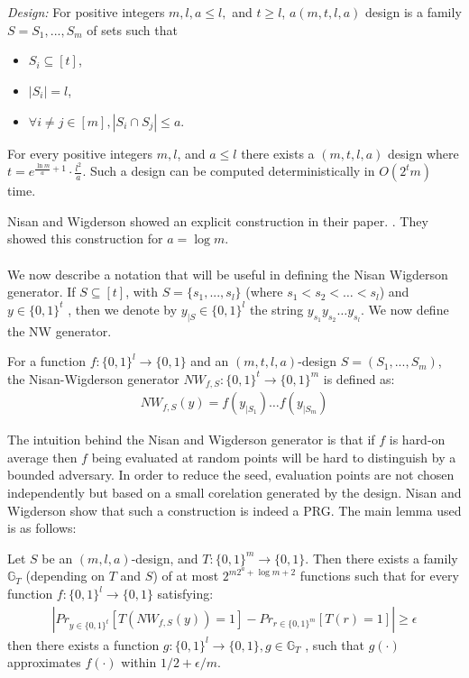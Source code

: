 \\~\\
\textit{Design:} For positive integers $m, l, a \leq l,$ and $t \geq l$, $a(m, t, l, a)$
design is a family $S = S_1 , . . . , S_m$ of sets such that
\begin{itemize}
	\item $S_i \subseteq [t]$,
	\item $|S_i| = l$,
	\item $\forall i \neq j \in [m], |S_i \cap S_j| \leq a$.
\end{itemize} 
\begin{lemma}
	\label{design_const}
	For every positive integers $m, l$, and $a \leq l$ there exists a $(m, t, l, a)$ design where $t = e^{\frac{\ln m}{a} + 1} \cdot \frac{l^2}{a}$. Such a design can be computed deterministically in $O(2^t m)$ time.
\end{lemma}
Nisan and Wigderson showed an explicit construction in their paper. \cite{Nisan:1994:HVR:192095.192097}. They showed this construction for $a = \log m$.
\\~\\
We now describe a notation that will be useful in defining the Nisan Wigderson generator. If $S \subseteq [t]$, with $S = \{s_1 , . . . , s_l \}$ (where $s_1 < s_2 < \ldots < s_l$) and $y \in \{0, 1\}^t$ , then we denote by $y_{|S} \in \{0, 1\}^l$ the string $y_{s_1}y_{s_2} \ldots y_{s_l}$. We now define the NW generator.
\begin{definition}
	For a function $f : \{0, 1\}^l \rightarrow \{0, 1\}$ and an $(m, t, l, a)$-design $S = (S_1 , . . . , S_m)$, the Nisan-Wigderson generator $NW_{f,S} : \{0,1\}^t \rightarrow \{0, 1\}^m$ is defined as:
	\begin{align*}
		NW_{f,S}(y) = f(y_{|S_1})\ldots f(y_{|S_m})
	\end{align*}
\end{definition}
The intuition behind the Nisan and Wigderson generator is that if $f$ is hard-on average then $f$ being evaluated at random points will be hard to distinguish by a bounded adversary. In order to reduce the seed, evaluation points are not chosen independently but based on a small corelation generated by the design. Nisan and Wigderson show that such a construction is indeed a PRG.
The main lemma used is as follows:
\begin{lemma}
Let $S$ be an $(m, l, a)$-design, and $T : \{0, 1\}^m \rightarrow \{0, 1\}$. Then there exists a family $\mathbb{G}_T$ (depending on $T$ and $S$) of at most $2^{m2^a +\log m+2}$ functions such that for every function $f : \{0, 1\}^l \rightarrow \{0, 1\}$ satisfying:
\begin{align*}
|Pr_{y \in \{0,1\}^t}[T(NW_{f,S}(y)) = 1] - Pr_{r \in \{0,1\}^m}[T(r) = 1]| \geq \epsilon
\end{align*}
then there exists a function $g : \{0, 1\}^l \rightarrow \{0, 1\}, g \in \mathbb{G}_T$ , such that $g(\cdot)$ approximates $f (\cdot)$ within $1/2 + \epsilon/m$.
\end{lemma}
